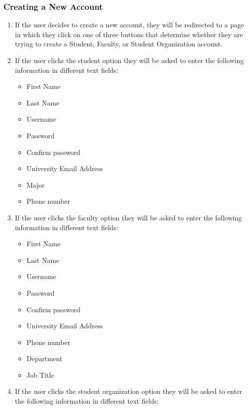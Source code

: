     \subsubsection{Creating a New Account}
        \begin{enumerate}[leftmargin=3\parindent]
            \item If the user decides to create a new account, they will be redirected to a page in which they click on one of three buttons that determine whether they are trying to create a Student, Faculty, or Student Organization account.
            \item If the user clicks the student option they will be asked to enter the following information in different text fields:
                \begin{itemize}
                    \item First Name
                    \item Last Name
                    \item Username
                    \item Password
                    \item Confirm password
                    \item University Email Address
                    \item Major
                    \item Phone number
                \end{itemize}
            \item If the user clicks the faculty option they will be asked to enter the following information in different text fields:
                \begin{itemize}
                    \item First Name
                    \item Last Name
                    \item Username
                    \item Password
                    \item Confirm password
                    \item University Email Address
                    \item Phone number
                    \item Department
                    \item Job Title
                \end{itemize}
            \item If the user clicks the student organization option they will be asked to enter the following information in different text fields:

\end{enumerate}
